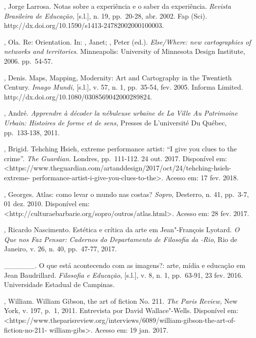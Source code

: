 \begin{Parskip}
, Jorge Larrosa. Notas sobre a experiência e o saber da
experiência. \emph{Revista Brasileira de Educação,} {[}s.l.{]}, n. 19,
pp.~20-28, abr. 2002. Fap (Sci).
http://dx.doi.org/10.1590/s1413-24782002000100003.

, Ola. Re: Orientation. In: , Janet; , Peter (ed.).
\emph{Else/Where: new cartographies of networks and territories}.
Minneapolis: University of Minnesota Design Institute, 2006. pp.~54-57.

, Denis. Maps, Mapping, Modernity: Art and Cartography in the
Twentieth Century. \emph{Imago Mundi,} {[}s.l.{]}, v. 57, n. 1,
pp.~35-54, fev. 2005. Informa  Limited.
http://dx.doi.org/10.1080/0308569042000289824.

, André. \emph{Apprendre à décoder la nébuleuse urbaine de La
Ville Au Patrimoine Urbain: Histoires de forme et de sens,} Presses de
L'université Du Québec, pp.~133-138, 2011.

, Brigid. Tehching Hsieh, extreme performance artist: ``I give
you clues to the crime''. \emph{The Guardian.} Londres, pp.~111-112. 24
out. 2017. Disponível em:
\textless{}https://www.theguardian.com/artanddesign/2017/oct/24/tehching-hsieh-extreme-
performance-artist-i-give-you-clues-to-the\textgreater{}. Acesso em: 17
fev. 2018.

, Georges. Atlas: como levar o mundo nas costas?
\emph{Sopro,} Desterro, n. 41, pp.~3-7, 01 dez. 2010. Disponível em:
\textless{}http://culturaebarbarie.org/sopro/outros/atlas.html\textgreater{}.
Acesso em: 28 fev. 2017.

, Ricardo Nascimento. Estética e crítica da arte em
Jean"-François Lyotard. \emph{O Que nos Faz Pensar: Cadernos do
Departamento de Filosofia da -Rio}, Rio de Janeiro, v. 26, n. 40,
pp.~47-77, 2017.

\_\_\_\_\_\_. O que está acontecendo com as imagens?: arte, mídia e
educação em Jean Baudrillard. \emph{Filosofia e Educação}, {[}s.l.{]},
v. 8, n. 1, pp.~63-91, 23 fev. 2016. Universidade Estadual de Campinas.

, William. William Gibson, the art of fiction No. 211. \emph{The
Paris Review,} New York, v. 197, p.~1, 2011. Entrevista por David
Wallace"-Wells. Disponível em:
\textless{}https://www.theparisreview.org/interviews/6089/william-gibson-the-art-of-fiction-no-211-
william-gibs\textgreater{}. Acesso em: 19 jan. 2017.


\end{Parskip}
